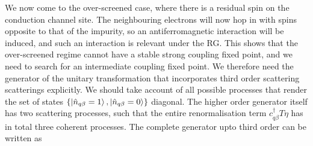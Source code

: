 \documentclass[reprint,prb,superscriptaddress]{revtex4-2}
\begin{document}
We now come to the over-screened case, where there is a residual spin on the conduction channel site. The neighbouring electrons will now hop in with spins opposite to that of the impurity, so an antiferromagnetic interaction will be induced, and such an interaction is relevant under the RG. This shows that the over-screened regime cannot have a stable strong coupling fixed point, and we need to search for an intermediate coupling fixed point. We therefore need the generator of the unitary transformation that incorporates third order scattering scatterings explicitly. We should take account of all possible processes that render the set of states \(\left\{\ket{\hat n_{q\beta}=1},\ket{\hat n_{q\beta}=0}\right\}\) diagonal. The higher order generator itself has two scattering processes, such that the entire renormalisation term \(c^\dagger_{q\beta} T \eta\) has in total three coherent processes. The complete generator upto third order can be written as
\end{document}
